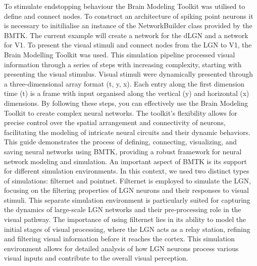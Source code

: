 \documentclass[12pt]{article}
\begin{document}
\bigbreak
To stimulate endstopping behaviour the Brain Modeling Toolkit was utilised to define and connect nodes. To construct an architecture of spiking point neurons it is necessary to initilialise an instance of the NetworkBuilder class provided by the BMTK. The current example will create a network for the dLGN and a network for V1. To present the visual stimuli and connect nodes from the LGN to V1, the Brain Modelling Toolkit was used. This simulation pipeline processed visual information through a series of steps with increasing complexity, starting with presenting the visual stimulus. Visual stimuli were dynamically presented through a three-dimensional array format (t, y, x). Each entry along the first dimension time (t) is a frame with input organised along the vertical (y) and horizontal (x) dimensions. By following these steps, you can effectively use the Brain Modeling Toolkit to create complex neural networks. The toolkit's flexibility allows for precise control over the spatial arrangement and connectivity of neurons, facilitating the modeling of intricate neural circuits and their dynamic behaviors. This guide demonstrates the process of defining, connecting, visualizing, and saving neural networks using BMTK, providing a robust framework for neural network modeling and simulation. An important aspect of BMTK is its support for different simulation environments. In this context, we used two distinct types of simulations: filternet and pointnet. Filternet is employed to simulate the LGN, focusing on the filtering properties of LGN neurons and their responses to visual stimuli. This separate simulation environment is particularly suited for capturing the dynamics of large-scale LGN networks and their pre-processing role in the visual pathway. The importance of using filternet lies in its ability to model the initial stages of visual processing, where the LGN acts as a relay station, refining and filtering visual information before it reaches the cortex. This simulation environment allows for detailed analysis of how LGN neurons process various visual inputs and contribute to the overall visual perception.
\bigbreak
\end{document}
